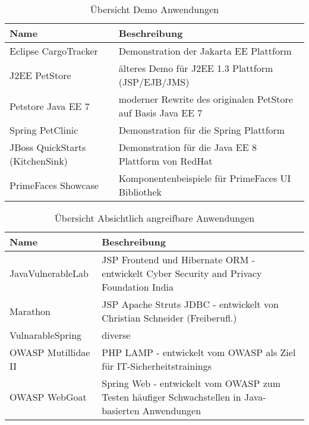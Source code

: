 \begin{table}[h]
  \centering
  \begin{tabular}{lp{7cm}}
    \toprule
    \textbf{Name} & \textbf{Beschreibung}\\
    \midrule
    Eclipse CargoTracker & Demonstration der Jakarta EE Plattform\\
    J2EE PetStore & älteres Demo für J2EE 1.3 Plattform (JSP/EJB/JMS)\\
    Petstore Java EE 7 & moderner Rewrite des originalen PetStore auf Basis Java EE 7 \\
    Spring PetClinic & Demonstration für die Spring Plattform \\
    JBoss QuickStarts (KitchenSink) & Demonstration für die Java EE 8 Plattform von RedHat\\
    PrimeFaces Showcase & Komponentenbeispiele für PrimeFaces UI Bibliothek\\
    \bottomrule
  \end{tabular}
  \caption{Übersicht Demo Anwendungen}
  \label{tab:exampleapp}
\end{table}

\begin{table}[h]
  \centering
  \begin{tabular}{lp{7cm}}
    \toprule
    \textbf{Name} & \textbf{Beschreibung} \\
    \midrule
    JavaVulnerableLab & JSP Frontend und Hibernate ORM - entwickelt Cyber Security and Privacy Foundation India \\
    Marathon & JSP Apache Struts JDBC  - entwickelt von Christian Schneider (Freiberufl.)\\
    VulnarableSpring & diverse\\
    OWASP Mutillidae II & PHP LAMP - entwickelt vom OWASP als Ziel für IT-Sicherheitstrainings \\
    OWASP WebGoat & Spring Web - entwickelt vom OWASP zum Testen häufiger Schwachstellen in Java-basierten Anwendungen\\
    \bottomrule
  \end{tabular}
  \caption{Übersicht Absichtlich angreifbare Anwendungen}
  \label{tab:vulnapp}
\end{table}

